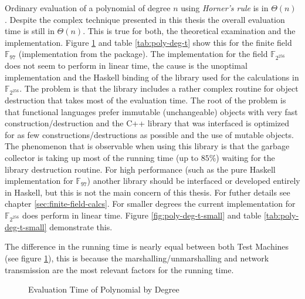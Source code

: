 Ordinary evaluation of a polynomial of degree $n$ using \emph{Horner's rule} is
in $\Theta(n)$ \cite{cormen01}. Despite the complex technique presented in this
thesis the overall evaluation time is still in $\Theta(n)$. This is true for
both, the theoretical examination and the implementation. Figure
\ref{fig:poly-deg-t} and table \ref{tab:poly-deg-t} show this for the finite
field $\mathbb{F}_{97}$ (implementation from the \JWTLhaskellForMaths{}
package). The implementation for the field $\mathbb{F}_{2^{256}}$ does not seem
to perform in linear time, the cause is the unoptimal implementation and the
Haskell binding of the library used for the calculations in
$\mathbb{F}_{2^{256}}$. The problem is that the library includes a rather
complex routine for object destruction that takes most of the evaluation time.
The root of the problem is that functional languages prefer immutable
(unchangeable) objects with very fast construction/destruction and the C++
library that was interfaced is optimized for as few constructions/destructions
as possible and the use of mutable objects. The phenomenon that is observable
when using this library is that the garbage collector is taking up most of the
running time (up to $85\%$) waiting for the library destruction routine. For
high performance (such as the pure Haskell implementation for $\mathbb{F}_{97}$)
another library should be interfaced or developed entirely in Haskell, but this
is not the main concern of this thesis. For futher details see chapter
\ref{sec:finite-field-calcs}. For smaller degrees the current implementation for
$\mathbb{F}_{2^{256}}$ does perform in linear time. Figure
\ref{fig:poly-deg-t-small} and table \ref{tab:poly-deg-t-small} demonstrate
this.

The difference in the running time is nearly equal between both Test Machines
(see figure \ref{fig:poly-deg-t}), this is because the marshalling/unmarshalling
and network transmission are the most relevant factors for the running time.

\begin{figure}[ht]
  \centering
  
  \caption{Evaluation Time of Polynomial by Degree}
  \label{fig:poly-deg-t}
\end{figure}

